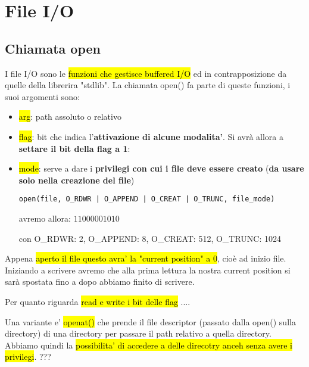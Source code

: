 \newpage
\section{File I/O}


\subsection{Chiamata open}

I file I/O sono le \hl{funzioni che gestisce buffered I/O} ed in contrapposizione da quelle della librerira "stdlib". La chiamata open() fa parte di queste funzioni, i suoi argomenti sono:

\begin{itemize}
	\item \hl{arg}: path assoluto o relativo
	\item \hl{flag}: bit che indica l'\textbf{attivazione di alcune modalita'}. Si avrà allora a \textbf{settare il bit della flag a 1}:
	\item \hl{mode}: serve a dare i \textbf{privilegi con cui i file deve essere creato} (\textbf{da usare solo nella creazione del file})
\begin{lstlisting}
open(file, O_RDWR | O_APPEND | O_CREAT | O_TRUNC, file_mode)
\end{lstlisting}

		avremo allora: $11000001010$

		con O\_RDWR: 2, O\_APPEND: 8, O\_CREAT: 512, O\_TRUNC: 1024
		
		
\end{itemize}

Appena \hl{aperto il file questo avra' la "current position" a 0}, cioè ad inizio file. Iniziando a scrivere avremo che alla prima lettura la nostra current position si sarà spostata fino a dopo abbiamo finito di scrivere.

Per quanto riguarda \hl{read e write i bit delle flag } ....

Una variante e' \hl{openat()} che prende il file descriptor (passato dalla open() sulla directory) di una directory per passare il path relativo a quella directory. Abbiamo quindi la \hl{possibilita' di accedere a delle direcotry anceh senza avere i privilegi}. ???
